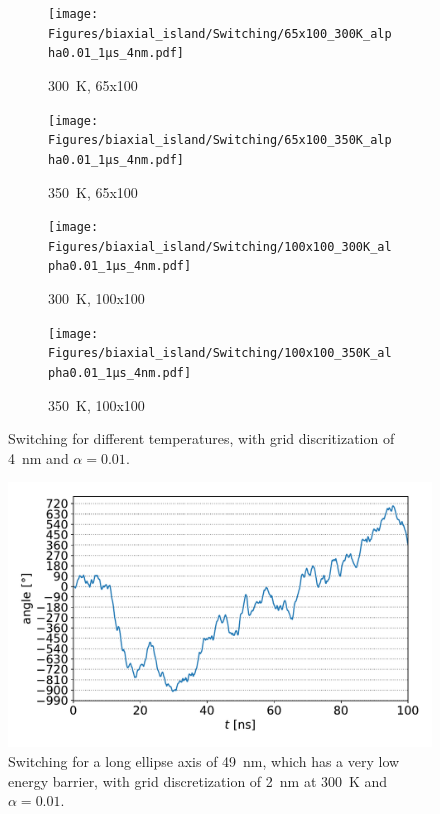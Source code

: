 \documentclass[10pt,a4paper]{article}
\begin{document}
\begin{figure}
     \centering
     \begin{subfigure}[b]{0.49\textwidth}
         \centering
         \texttt{[image: Figures/biaxial\_island/Switching/65x100\_300K\_alpha0.01\_1µs\_4nm.pdf]}
         \caption{\SI{300}{\kelvin}, 65x100}
         \label{fig:switching-temp-300-65x100}
     \end{subfigure}
     \hfill
     \begin{subfigure}[b]{0.49\textwidth}
         \centering
         \texttt{[image: Figures/biaxial\_island/Switching/65x100\_350K\_alpha0.01\_1µs\_4nm.pdf]}
         \caption{\SI{350}{\kelvin}, 65x100}
         \label{fig:switching-temp-350-65x100}
     \end{subfigure}
     \begin{subfigure}[b]{0.49\textwidth}
         \centering
         \texttt{[image: Figures/biaxial\_island/Switching/100x100\_300K\_alpha0.01\_1µs\_4nm.pdf]}
         \caption{\SI{300}{\kelvin}, 100x100}
         \label{fig:switching-temp-300-100x100}
     \end{subfigure}
     \hfill
     \begin{subfigure}[b]{0.49\textwidth}
         \centering
         \texttt{[image: Figures/biaxial\_island/Switching/100x100\_350K\_alpha0.01\_1µs\_4nm.pdf]}
         \caption{\SI{350}{\kelvin}, 100x100}
         \label{fig:switching-temp-350-100x100}
     \end{subfigure}
    \caption{Switching for different temperatures, with grid discritization of \SI{4}{\nano\metre} and $\alpha = 0.01$.}
    \label{fig:switching-temp}
\end{figure}
\begin{figure}
    \centering
    \includegraphics[width=0.9\columnwidth]{Figures/biaxial_island/Switching/49x100_300K_alpha0.01_100ns_2nm.pdf}
    \caption{Switching for a long ellipse axis of \SI{49}{\nano\metre}, which has a very low energy barrier, with grid discretization of \SI{2}{\nano\metre} at \SI{300}{\kelvin} and $\alpha = 0.01$.}
    \label{fig:switching-49x100-300}
\end{figure}
\end{document}
